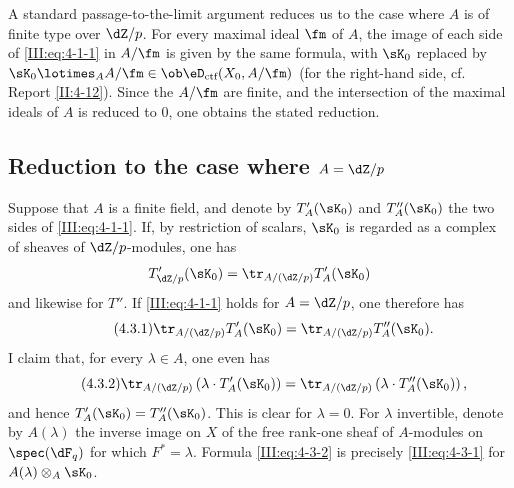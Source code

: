 \documentclass[oneside]{book}
\begin{document}
A standard passage-to-the-limit argument reduces us to the case where $A$ is
of finite type over $\dZ/p$. For every maximal ideal $\fm$ of $A$, the image
of each side of \eqref{III:eq:4-1-1} in $A/\fm$ is given by the same formula,
with $\sK_0$ replaced by
$\sK_0\lotimes_A A/\fm\in\ob\eD_\text{ctf}(X_0,A/\fm)$ (for the right-hand
side, cf. Report \ref{II:4-12}). Since the $A/\fm$ are finite, and the
intersection of the maximal ideals of $A$ is reduced to $0$, one obtains the
stated reduction.






\subsection{Reduction to the case where \texorpdfstring{$A=\dZ/p$}{A=Z/p}}\label{III:4-3}

Suppose that $A$ is a finite field, and denote by $T_A'(\sK_0)$ and
$T_A''(\sK_0)$ the two sides of \eqref{III:eq:4-1-1}. If, by restriction of
scalars, $\sK_0$ is regarded as a complex of sheaves of $\dZ/p$-modules, one
has
\[
  T_{\dZ/p}'(\sK_0) = \tr_{A/(\dZ/p)} T_A'(\sK_0)
\]
and likewise for $T''$. If \eqref{III:eq:4-1-1} holds for $A=\dZ/p$, one
therefore has
\begin{equation*}\tag{4.3.1}\label{III:eq:4-3-1}
  \tr_{A/(\dZ/p)} T_A'(\sK_0) = \tr_{A/(\dZ/p)} T_A''(\sK_0) \text{.}
\end{equation*}
I claim that, for every $\lambda\in A$, one even has
\begin{equation*}\tag{4.3.2}\label{III:eq:4-3-2}
  \tr_{A/(\dZ/p)}\left(\lambda\cdot T_A'(\sK_0)\right) = \tr_{A/(\dZ/p)}\left(\lambda\cdot T_A''(\sK_0)\right) \text{,}
\end{equation*}
and hence $T_A'(\sK_0) = T_A''(\sK_0)$. This is clear for $\lambda=0$. For
$\lambda$ invertible, denote by $A(\lambda)$ the inverse image on $X$ of the
free rank-one sheaf of $A$-modules on $\spec(\dF_q)$ for which
$F^*=\lambda$. Formula \eqref{III:eq:4-3-2} is precisely
\eqref{III:eq:4-3-1} for $A(\lambda)\otimes_A \sK_0$.
\end{document}

